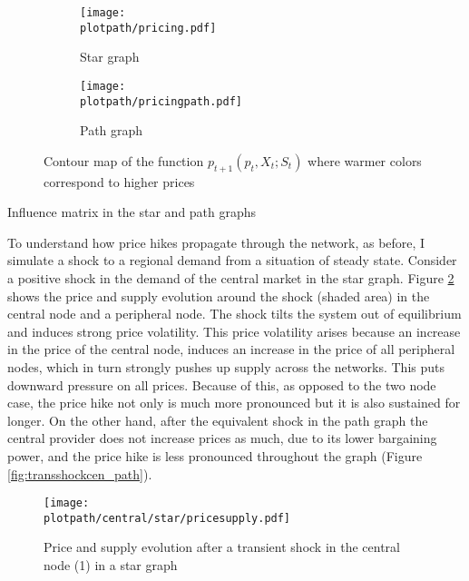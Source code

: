 \begin{center}
  \begin{figure}[H]
    \begin{subfigure}{0.475\textwidth}
      \centering
      \texttt{[image: \\plotpath/pricing.pdf]}
      \caption{Star graph}
    \end{subfigure}
    \hfill
    \begin{subfigure}{0.475\textwidth}
      \centering
      \texttt{[image: \\plotpath/pricingpath.pdf]}
      \caption{Path graph}
    \end{subfigure}
    \caption{Contour map of the function $p_{t+1}(p_t, X_t; S_t)$ where warmer colors correspond to higher prices}
    \label{fig:p}
  \end{figure}


  \begin{table}[H]
    \centering
    
    \caption{Influence matrix in the star and path graphs}
    \label{table:influence}
  \end{table}
\end{center}

To understand how price hikes propagate through the network, as before, I simulate a shock to a regional demand from a situation of steady state. Consider a positive shock in the demand of the central market in the star graph. Figure \ref{fig:transshockcen_star} shows the price and supply evolution around the shock (shaded area) in the central node and a peripheral node. The shock tilts the system out of equilibrium and induces strong price volatility. This price volatility arises because an increase in the price of the central node, induces an increase in the price of all peripheral nodes, which in turn strongly pushes up supply across the networks. This puts downward pressure on all prices. Because of this, as opposed to the two node case, the price hike not only is much more pronounced but it is also sustained for longer. On the other hand, after the equivalent shock in the path graph the central provider does not increase prices as much, due to its lower bargaining power, and the price hike is less pronounced throughout the graph (Figure \ref{fig:transshockcen_path}).

\newpage
\begin{figure}[H]
  \centering
  \texttt{[image: \\plotpath/central/star/pricesupply.pdf]}
  \caption{Price and supply evolution after a transient shock in the central node (1) in a star graph} \label{fig:transshockcen_star}
\end{figure}

